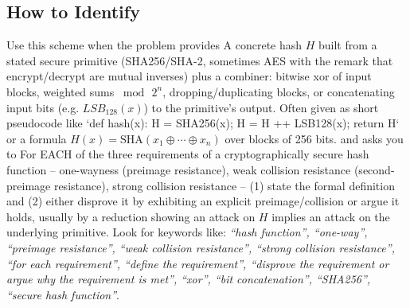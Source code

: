 \documentclass[12pt, a4paper]{article}
\begin{document}
\subsection*{How to Identify}
Use this scheme when the problem provides A concrete hash $H$ built from a stated secure primitive (SHA256/SHA-2, sometimes AES with the remark that encrypt/decrypt are mutual inverses) plus a combiner: bitwise xor of input blocks, weighted sums $\bmod\, 2^n$, dropping/duplicating blocks, or concatenating input bits (e.g. $LSB_{128}(x)$) to the primitive's output. Often given as short pseudocode like `def hash(x): H = SHA256(x); H = H ++ LSB128(x); return H` or a formula $H(x) = \mathrm{SHA}(x_1 \oplus \cdots \oplus x_n)$ over blocks of 256 bits. and asks you to For EACH of the three requirements of a cryptographically secure hash function -- one-wayness (preimage resistance), weak collision resistance (second-preimage resistance), strong collision resistance -- (1) state the formal definition and (2) either disprove it by exhibiting an explicit preimage/collision or argue it holds, usually by a reduction showing an attack on $H$ implies an attack on the underlying primitive. Look for keywords like: \textit{``hash function'', ``one-way'', ``preimage resistance'', ``weak collision resistance'', ``strong collision resistance'', ``for each requirement'', ``define the requirement'', ``disprove the requirement or argue why the requirement is met'', ``xor'', ``bit concatenation'', ``SHA256'', ``secure hash function''}.
\end{document}
